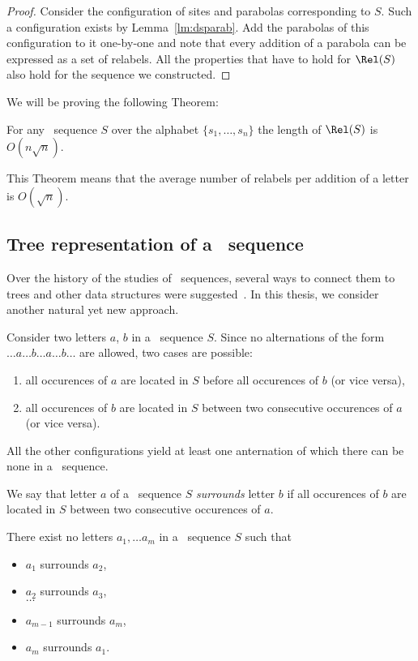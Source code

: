 \begin{proof}Consider the configuration of sites and parabolas corresponding to $S$. Such a configuration exists by Lemma~\ref{lm:dsparab}. Add the parabolas of this configuration to it one-by-one and note that every addition of a parabola can be expressed as a set of relabels. All the properties that have to hold for $\Rel(S)$ also hold for the sequence we constructed.\end{proof}

We will be proving the following Theorem:

\begin{theorem} \label{thm:amortsqrt}
	For any \Ds~sequence $S$ over the alphabet $\{ s_1, \ldots, s_n \}$ the length of $\Rel(S)$ is $O (n \sqrt n)$.
\end{theorem}

This Theorem means that the average number of relabels per addition of a letter is $O(\sqrt{n})$.

\subsection{Tree representation of a \Ds~sequence}

Over the history of the studies of \Ds~sequences, several ways to connect them to trees and other data structures were suggested~\cite{dstrees,dssplay}. In this thesis, we consider another natural yet new approach.

Consider two letters $a$, $b$ in a \Ds~sequence $S$. Since no alternations of the form
$\ldots a \ldots b \ldots a \ldots b \ldots$
are allowed, two cases are possible: \begin{enumerate}
	\item all occurences of $a$ are located in $S$ before all occurences of $b$ (or vice versa),
	\item all occurences of $b$ are located in $S$ between two consecutive occurences of $a$ (or vice versa).
\end{enumerate}

All the other configurations yield at least one anternation of which there can be none in a \Ds~sequence.

\begin{definition}
	We say that letter $a$ of a \Ds~sequence $S$ \emph{surrounds} letter $b$ if all occurences of $b$ are located in $S$ between two consecutive occurences of $a$.
\end{definition}

\begin{lemma} \label{lm:dsacycl}
	There exist no letters $a_1, \ldots a_m$ in a \Ds~sequence $S$ such that \begin{itemize}
	   \item $a_1$ surrounds $a_2$,
	   \item $a_2$ surrounds $a_3$,\\ $\ldots$
	   \item $a_{m-1}$ surrounds $a_m$,
	   \item $a_m$ surrounds $a_1$.
	\end{itemize}
\end{lemma}

